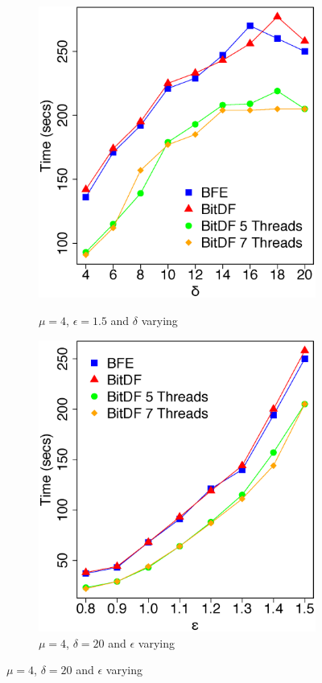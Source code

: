 {\begin{figure}[h!]
    \centering
    \caption{Results varying $\delta$ and $\epsilon$ for Trucks dataset}
    \begin{subfigure}[t]{0.49\textwidth}
        \caption{$\mu = 4$, $\epsilon = 1.5$ and $\delta$ varying}
        \includegraphics[width=\textwidth]{images/Trucks_complete_varying_l.eps}
        \label{fig:trucks_complete_vary_l}
    \end{subfigure}
    \begin{subfigure}[t]{0.49\textwidth}
        \caption{$\mu = 4$, $\delta = 20$ and $\epsilon$ varying}
        \includegraphics[width=\textwidth]{images/Trucks_complete_varying_g.eps}

\end{subfigure}
\end{figure}}
